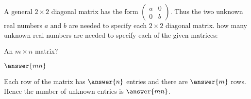 \documentclass{ximera}
\begin{document}


%
%
%
%
%





\problemlabel

\noindent A general $2\times 2$ diagonal matrix has the form $\left(\begin{array}{rr} a & 0 \\ 0 & b\end{array}\right)$.  Thus the two unknown real numbers $a$ and $b$ are needed to specify each $2\times 2$ diagonal matrix.  how many unknown real numbers are needed to specify each of the given matrices:

\begin{exercise}  \label{c1.3.2}
An $m\times n$ matrix? \begin{prompt}$\answer{mn}$\end{prompt}

\begin{solution}
Each row of the matrix has $\answer{n}$ entries and there are $\answer{m}$ rows.  Hence the number of unknown entries is $\answer{mn}$.

\end{solution}
\end{exercise}
\end{document}
